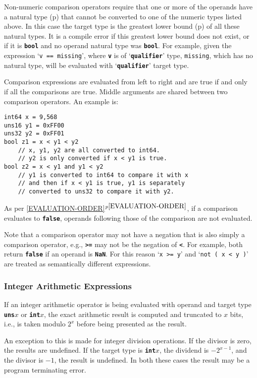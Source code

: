 \documentclass[12pt]{article}
\newcommand{\TT}[1]{{\tt \bfseries #1}}
\newcommand{\itemref}[1]{\ref{#1}$^{p\pageref{#1}}$}
\newcommand{\pagref}[1]{p\pageref{#1}}
\newenvironment{indpar}[1][0.3in]%
	{\begin{list}{}%
		     {\setlength{\itemsep}{0in}%
		      \setlength{\topsep}{0in}%
		      \setlength{\parsep}{1ex}%
		      \setlength{\labelwidth}{#1}%
		      \setlength{\leftmargin}{#1}%
		      \addtolength{\leftmargin}{\labelsep}}%
	 \item}%
	{\end{list}}
\begin{document}
Non-numeric comparison operators require that one or more of
the operands have a natural type (\pagref{NATURAL-TYPE}) that
cannot be converted to one of the numeric types listed above.
In this case the target type is
the greatest lower bound (\pagref{GREATEST-LOWER-BOUND})
of all these natural types.
It is a compile error if this greatest lower bound does
not exist, or if it is \TT{bool} and no operand natural type was \TT{bool}.
For example, given the expression `{\tt v == missing}', where \TT{v}
is of `\TT{qualifier}' type, {\tt missing}, which has no natural type, will be
evaluated with `\TT{qualifier}' target type.

Comparison expressions are evaluated from left to right and are
true if and only if all the comparisons are true.  Middle
arguments are shared between two comparison operators.
An example is:

\begin{indpar}\begin{verbatim}
int64 x = 9,568
uns16 y1 = 0xFF00
uns32 y2 = 0xFF01
bool z1 = x < y1 < y2
    // x, y1, y2 are all converted to int64.
    // y2 is only converted if x < y1 is true.
bool z2 = x < y1 and y1 < y2
    // y1 is converted to int64 to compare it with x
    // and then if x < y1 is true, y1 is separately
    // converted to uns32 to compare it with y2.
\end{verbatim}\end{indpar}

As per \itemref{EVALUATION-ORDER}, if a comparison evaluates
to \TT{false}, operands following those of the comparison
are not evaluated.

Note that a comparison operator may not have a negation that is
also simply a comparison operator, e.g., \TT{>=} may not be the
negation of \TT{<}.  For example, both return \TT{false} if an
operand is \TT{NaN}.  For this reason `{\tt x >= y}' and
`{\tt not ( x < y )}' are treated as semantically different
expressions.

\subsubsection{Integer Arithmetic Expressions}

If an integer arithmetic operator is being evaluated with
operand and target type \TT{uns$x$} or \TT{int$x$}, the
exact arithmetic result is computed and truncated to
$x$ bits, i.e., is taken modulo $2^x$ before being presented
as the result.

An exception to this is made for integer division operations.
If the divisor is zero, the results are undefined.  If the
target type is \TT{int$x$}, the dividend is $-2^{x-1}$, and
the divisor is $-1$, the result is undefined.  In both these
cases the result may be a program terminating error.
\end{document}
